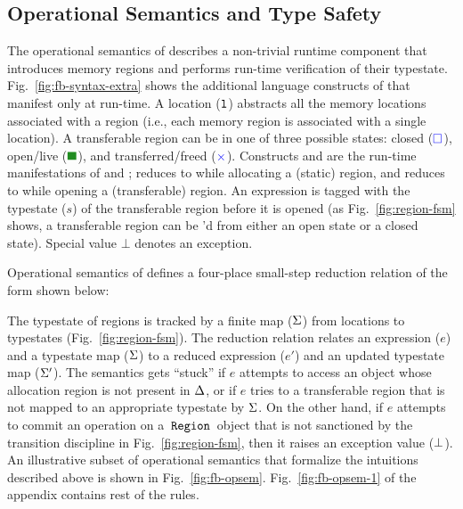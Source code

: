 \subsection{Operational Semantics and Type Safety}
\label{sec:fb-opsem}



The operational semantics of \FB describes a non-trivial runtime
component that introduces memory regions and performs run-time
verification of their typestate. Fig.~\ref{fig:fb-syntax-extra} shows the
additional language constructs of \FB that manifest only at run-time.
A location ($\mathtt{l}$) abstracts all the memory locations associated with
a region (i.e., each memory region is associated with a single
location). A transferable region can be in one of three possible
states: closed (${\color{blue} \square}$), open/live ($\LIVE$), and transferred/freed
(${\color{blue}\times}$). Constructs  and  are the run-time
manifestations of  and ;  reduces to 
while allocating a (static) region, and  reduces to 
while opening a (transferable) region. An 
expression is tagged with the typestate ($s$) of the transferable
region before it is opened (as Fig.~\ref{fig:region-fsm} shows, a
transferable region can be 'd from either an open state or a
closed state). Special value $\bot$ denotes an exception. 

Operational semantics of \FB defines a four-place small-step reduction
relation of the form shown below:
\begin{smathpar}
\end{smathpar}
The typestate of regions is tracked by a finite map ($\Sigma$) from
locations to typestates (Fig.~\ref{fig:region-fsm}). The reduction
relation relates an expression ($e$) and a typestate map ($\Sigma$) to a
reduced expression ($e'$) and an updated typestate map ($\Sigma'$). The
semantics gets ``stuck'' if $e$ attempts to access an object whose
allocation region is not present in $\Delta$, or if $e$ tries to
 a transferable region that is not mapped to an appropriate
typestate by $\Sigma$.  On the other hand, if $e$ attempts to commit an
operation on a $\,{\tt Region}\,$ object that is not sanctioned by the transition
discipline in Fig.~\ref{fig:region-fsm}, then it raises an exception
value ($\bot$). An illustrative subset of operational semantics
that formalize the intuitions described above is shown in
Fig.~\ref{fig:fb-opsem}.  Fig.~\ref{fig:fb-opsem-1} of the appendix
contains rest of the rules. 

